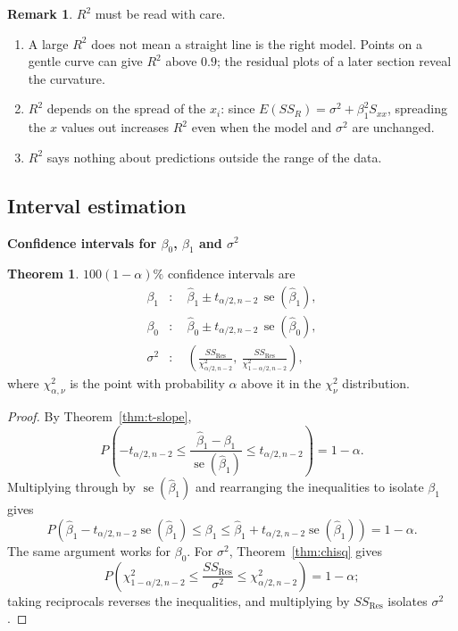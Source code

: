 \documentclass[11pt,a4paper]{article}
\numberwithin{equation}{section}
\theoremstyle{definition}
\newtheorem{thm}{Theorem}[subsection]
\newtheorem*{remark}{Remark}
\newcommand{\subhead}[1]{%
  \par\medskip\noindent\textbf{#1}\par\nobreak\smallskip}
\begin{document}
\begin{remark}
$R^2$ must be read with care.
\begin{enumerate}
\item A large $R^2$ does not mean a straight line is the right model. Points on a gentle
curve can give $R^2$ above $0.9$; the residual plots of a later section reveal the curvature.
\item $R^2$ depends on the spread of the $x_i$: since $E(SS_R) = \sigma^2 + \beta_1^2 S_{xx}$,
spreading the $x$ values out increases $R^2$ even when the model and $\sigma^2$ are unchanged.
\item $R^2$ says nothing about predictions outside the range of the data.
\end{enumerate}
\end{remark}

\subsection{Interval estimation}
\subhead{Confidence intervals for $\beta_0$, $\beta_1$ and $\sigma^2$}
\begin{thm}
$100(1-\alpha)\%$ confidence intervals are
\begin{align*}
\beta_1&\colon\quad \hat\beta_1 \pm t_{\alpha/2, n-2}\, \operatorname{se}(\hat\beta_1), \\
\beta_0&\colon\quad \hat\beta_0 \pm t_{\alpha/2, n-2}\, \operatorname{se}(\hat\beta_0), \\
\sigma^2&\colon\quad \left( \frac{SS_{\mathrm{Res}}}{\chi^2_{\alpha/2, n-2}},\ \frac{SS_{\mathrm{Res}}}{\chi^2_{1-\alpha/2, n-2}} \right),
\end{align*}
where $\chi^2_{\alpha, \nu}$ is the point with probability $\alpha$ above it in the
$\chi^2_\nu$ distribution.
\end{thm}

\begin{proof}
By Theorem~\ref{thm:t-slope},
\[
P\left( -t_{\alpha/2,n-2} \le \frac{\hat\beta_1 - \beta_1}{\operatorname{se}(\hat\beta_1)} \le t_{\alpha/2,n-2} \right) = 1 - \alpha .
\]
Multiplying through by $\operatorname{se}(\hat\beta_1)$ and rearranging the inequalities to
isolate $\beta_1$ gives
\[
P\left( \hat\beta_1 - t_{\alpha/2,n-2}\operatorname{se}(\hat\beta_1) \le \beta_1
       \le \hat\beta_1 + t_{\alpha/2,n-2}\operatorname{se}(\hat\beta_1) \right) = 1 - \alpha .
\]
The same argument works for $\beta_0$. For $\sigma^2$, Theorem~\ref{thm:chisq} gives
\[
P\left( \chi^2_{1-\alpha/2,n-2} \le \frac{SS_{\mathrm{Res}}}{\sigma^2} \le \chi^2_{\alpha/2,n-2} \right) = 1 - \alpha ;
\]
taking reciprocals reverses the inequalities, and multiplying by $SS_{\mathrm{Res}}$ isolates
$\sigma^2$.
\end{proof}
\end{document}
